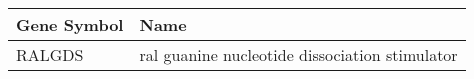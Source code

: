 \begin{tabular}{ll}
\toprule
Gene Symbol &                                           Name \\
\midrule
     RALGDS & ral guanine nucleotide dissociation stimulator \\
\bottomrule
\end{tabular}
